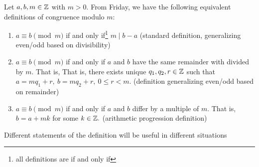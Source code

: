 \documentclass{ximera}
\begin{document}

\begin{defn}\label{defn:mod-equiv-all}
    Let $a,b,m\in\mathbb Z$ with $m>0.$ From Friday, we have the following equivalent definitions of congruence modulo $m:$
    \begin{enumerate}
     \item $a\equiv b \pmod m$ if and only if\footnote{all definitions are if and only if} $m\mid b-a$ (standard definition, generalizing even/odd based on divisibility)
     \item $a\equiv b \pmod m$ if and only if $a$ and $b$ have the same remainder with divided by $m.$ That is, That is, there exists unique $q_1,q_2,r\in\mathbb Z$ such that  $a=mq_1+r,\   b=mq_2+r,\  0\leq r<m.$ (definition generalizing even/odd based on remainder)
    \item $a\equiv b\pmod m$ if and only if $a$ and $b$ differ by a multiple of $m.$ That is, $b=a+mk$ for some $k\in\mathbb Z.$ (arithmetic progression definition)
    \end{enumerate}
    \end{defn}
    
    Different statements of the definition will be useful in different situations
    
\end{document}
